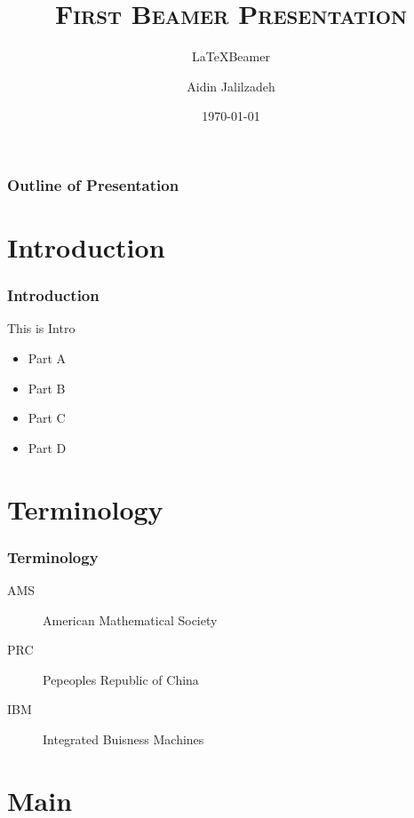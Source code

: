 \documentclass{beamer}
\title{\textsc{First Beamer Presentation}}
\subtitle{\LaTeX Beamer}
\author{Aidin Jalilzadeh}
\institute{UNNC}
\date{\today}
\begin{document}
\begin{frame}
\titlepage
\end{frame}

\begin{frame}\frametitle{Outline of Presentation}\label{outline}
\tableofcontents
\end{frame}

\section{Introduction}
\begin{frame}\frametitle{Introduction}\label{intro}
This is Intro
\begin{itemize}
\item<1-> Part A
\item <2-> Part B
\item <3-> Part C
\item <4-> Part D
\end{itemize}
\hyperlink{data}{}
\end{frame}


\section{Terminology}
\begin{frame}\frametitle{Terminology}
\begin{description}
\item[AMS] American Mathematical Society
\item[PRC] Pepeoples Republic of China
\item[IBM] Integrated Buisness Machines
\end{description}
\end{frame}

\section{Main}
\end{document}
